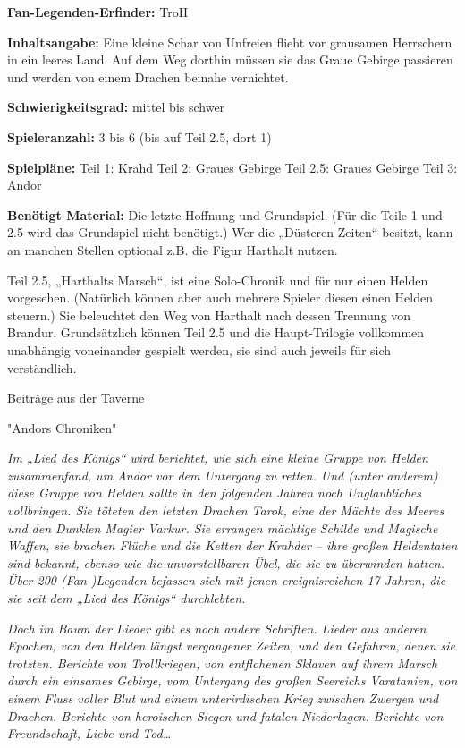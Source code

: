 {


\textbf{Fan-Legenden-Erfinder:} TroII

\textbf{Inhaltsangabe:} Eine kleine Schar von Unfreien flieht vor grausamen Herrschern in ein leeres Land. Auf dem Weg dorthin müssen sie das Graue Gebirge passieren und werden von einem Drachen beinahe vernichtet.

\textbf{Schwierigkeitsgrad:} mittel bis schwer

\textbf{Spieleranzahl:} 3 bis 6 (bis auf Teil 2.5, dort 1)

\textbf{Spielpläne:}
Teil 1: Krahd
Teil 2: Graues Gebirge
Teil 2.5: Graues Gebirge
Teil 3: Andor

\textbf{Benötigt Material:} Die letzte Hoffnung und Grundspiel. (Für die Teile 1 und 2.5 wird das Grundspiel nicht benötigt.)
Wer die „Düsteren Zeiten“ besitzt, kann an manchen Stellen optional z.B. die Figur Harthalt nutzen.

Teil 2.5, „Harthalts Marsch“, ist eine Solo-Chronik und für nur einen Helden vorgesehen. (Natürlich können aber auch mehrere Spieler diesen einen Helden steuern.) Sie beleuchtet den Weg von Harthalt nach dessen Trennung von Brandur. Grundsätzlich können Teil 2.5 und die Haupt-Trilogie vollkommen unabhängig voneinander gespielt werden, sie sind auch jeweils für sich verständlich.


\begin{center}
    Beiträge aus der Taverne

    "Andors Chroniken"
\end{center}

\textit{Im „Lied des Königs“ wird berichtet, wie sich eine kleine Gruppe von Helden zusammenfand, um Andor vor dem Untergang zu retten. Und (unter anderem) diese Gruppe von Helden sollte in den folgenden Jahren noch Unglaubliches vollbringen. Sie töteten den letzten Drachen Tarok, eine der Mächte des Meeres und den Dunklen Magier Varkur. Sie errangen mächtige Schilde und Magische Waffen, sie brachen Flüche und die Ketten der Krahder – ihre großen Heldentaten sind bekannt, ebenso wie die unvorstellbaren Übel, die sie zu überwinden hatten. Über 200 (Fan-)Legenden befassen sich mit jenen ereignisreichen 17 Jahren, die sie seit dem „Lied des Königs“ durchlebten.}


\textit{Doch im Baum der Lieder gibt es noch andere Schriften. Lieder aus anderen Epochen, von den Helden längst vergangener Zeiten, und den Gefahren, denen sie trotzten. Berichte von Trollkriegen, von entflohenen Sklaven auf ihrem Marsch durch ein einsames Gebirge, vom Untergang des großen Seereichs Varatanien, von einem Fluss voller Blut und einem unterirdischen Krieg zwischen Zwergen und Drachen. Berichte von heroischen Siegen und fatalen Niederlagen. Berichte von Freundschaft, Liebe und Tod…}

}
